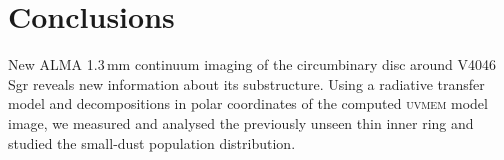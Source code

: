 \documentclass[letters, usenatbib]{mnras}
\begin{document}


\section{Conclusions} \label{sec:Conclusions}

New ALMA 1.3\,mm continuum imaging of the circumbinary disc around V4046\,Sgr reveals new information about its substructure. Using a radiative transfer model and decompositions in polar coordinates of the computed \textsc{uvmem} model image, we measured and analysed the previously unseen thin inner ring and studied the small-dust population distribution.
\end{document}
